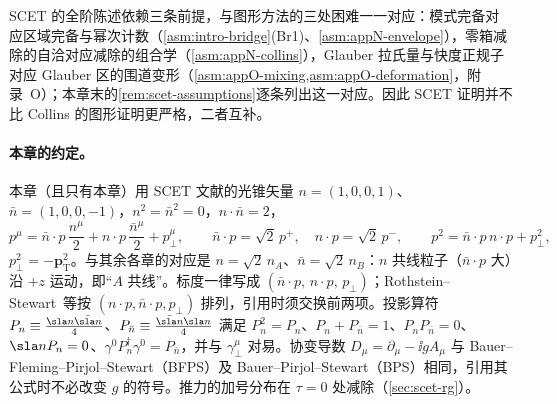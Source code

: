SCET 的全阶陈述依赖三条前提，与图形方法的三处困难一一对应：模式完备对应区域完备与幂次计数（\cref{asm:intro-bridge}(Br1)、\cref{asm:appN-envelope}），零箱减除的自洽对应减除的组合学（\cref{asm:appN-collins}），Glauber 拉氏量与快度正规子对应 Glauber 区的围道变形（\cref{asm:appO-mixing,asm:appO-deformation}，附录~O）；本章末的\cref{rem:scet-assumptions}逐条列出这一对应。因此 SCET 证明并不比 Collins 的图形证明更严格，二者互补。

\paragraph{本章的约定。}
本章（且只有本章）用 SCET 文献的光锥矢量 $n=(1,0,0,1)$、$\bar n=(1,0,0,-1)$，$n^2=\bar n^2=0$，$n\cdot\bar n=2$，
\begin{equation}\label{eq:scet-decomp}
p^\mu=\bar n\cdot p\,\frac{n^\mu}{2}+n\cdot p\,\frac{\bar n^\mu}{2}+p_\perp^\mu,\qquad
\bar n\cdot p=\sqrt2\,p^+,\quad n\cdot p=\sqrt2\,p^-,\qquad p^2=\bar n\cdot p\,n\cdot p+p_\perp^2 ,
\end{equation}
$p_\perp^2=-\bm p_{\mathrm T}^2$。与其余各章的对应是 $n=\sqrt2\,n_A$、$\bar n=\sqrt2\,n_B$：$n$ 共线粒子（$\bar n\cdot p$ 大）沿 $+z$ 运动，即“$A$ 共线”。标度一律写成 $(\bar n\cdot p,\,n\cdot p,\,p_\perp)$；Rothstein--Stewart~\cite{RothsteinStewart2016}等按 $(n\cdot p,\bar n\cdot p,p_\perp)$ 排列，引用时须交换前两项。投影算符 $P_n\equiv\frac{\sla n\bar{\sla n}}{4}$、$P_{\bar n}\equiv\frac{\bar{\sla n}\sla n}{4}$ 满足 $P_n^2=P_n$、$P_n+P_{\bar n}=1$、$P_nP_{\bar n}=0$、$\sla nP_n=0$、$\gamma^0P_n^\dagger\gamma^0=P_{\bar n}$，并与 $\gamma_\perp^\mu$ 对易。协变导数 $D_\mu=\partial_\mu-\ii gA_\mu$ 与 Bauer--Fleming--Pirjol--Stewart（BFPS）\cite{BauerEtAl2001}及 Bauer--Pirjol--Stewart（BPS）\cite{BauerPirjolStewart2002}相同，引用其公式时不必改变 $g$ 的符号。推力的加号分布在 $\tau=0$ 处减除（\cref{sec:scet-rg}）。
